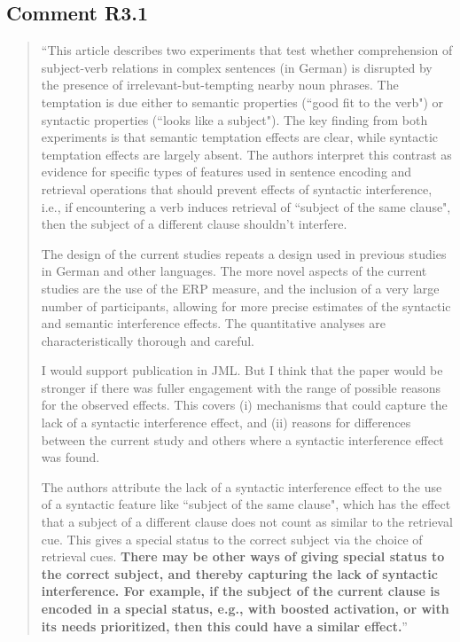 \documentclass[12pt]{article}
\begin{document}
\subsection*{Comment R3.1}
\begin{quote}
``This article describes two experiments that test whether comprehension of subject-verb relations in complex sentences (in German) is disrupted by the presence of irrelevant-but-tempting nearby noun phrases. The temptation is due either to semantic properties (``good fit to the verb") or syntactic properties (``looks like a subject"). The key finding from both experiments is that semantic temptation effects are clear, while syntactic temptation effects are largely absent. The authors interpret this contrast as evidence for specific types of features used in sentence encoding and retrieval operations that should prevent effects of syntactic interference, i.e., if encountering a verb induces retrieval of ``subject of the same clause", then the subject of a different clause shouldn't interfere.

The design of the current studies repeats a design used in previous studies in German and other languages. The more novel aspects of the current studies are the use of the ERP measure, and the inclusion of a very large number of participants, allowing for more precise estimates of the syntactic and semantic interference effects. The quantitative analyses are characteristically thorough and careful.

I would support publication in JML. But I think that the paper would be stronger if there was fuller engagement with the range of possible reasons for the observed effects. This covers (i) mechanisms that could capture the lack of a syntactic interference effect, and (ii) reasons for differences between the current study and others where a syntactic interference effect was found.

The authors attribute the lack of a syntactic interference effect to the use of a syntactic feature like ``subject of the same clause", which has the effect that a subject of a different clause does not count as similar to the retrieval cue. This gives a special status to the correct subject via the choice of retrieval cues. \textbf{There may be other ways of giving special status to the correct subject, and thereby capturing the lack of syntactic interference. For example, if the subject of the current clause is encoded in a special status, e.g., with boosted activation, or with its needs prioritized, then this could have a similar effect.}''
\end{quote}
\end{document}
